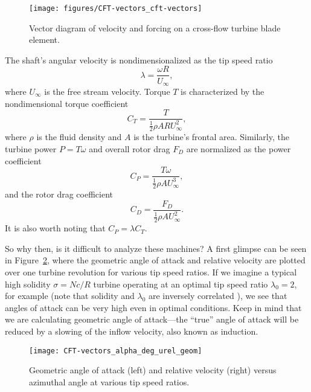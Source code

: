 \begin{figure}[ht]
    \centering
    
    \texttt{[image: figures/CFT-vectors\_cft-vectors]}
    
    \caption{Vector diagram of velocity and forcing on a cross-flow turbine
        blade element.}
    
    \label{fig:vectors}
\end{figure}

The shaft's angular velocity is nondimensionalized as the tip speed ratio
\begin{equation}
    \lambda = \frac{\omega R}{U_\infty},
    \label{eq:lambda}
\end{equation}
where $U_\infty$ is the free stream velocity.
Torque $T$ is characterized by the nondimensional torque coefficient 
\begin{equation}
    C_T = \frac{T}{\frac{1}{2} \rho A R U_\infty^2},
    \label{eq:ct}
\end{equation}
where $\rho$ is the fluid density and $A$ is the turbine's frontal area.
Similarly, the turbine power $P = T\omega$ and overall rotor drag $F_D$ are
normalized as the power coefficient
\begin{equation}
    C_P = \frac{T \omega}{\frac{1}{2} \rho A U_\infty^3},
    \label{eq:cp}
\end{equation}
and the rotor drag coefficient
\begin{equation}
    C_D = \frac{F_D}{\frac{1}{2} \rho A U_\infty^2}.
    \label{eq:cd}
\end{equation}
It is also worth noting that $C_P = \lambda C_T$.

So why then, is it difficult to analyze these machines? A first glimpse can be
seen in Figure~\ref{fig:geom-alpha-urel}, where the geometric angle of attack
and relative velocity are plotted over one turbine revolution for various tip
speed ratios. If we imagine a typical high solidity $\sigma = Nc/R$ turbine
operating at an optimal tip speed ratio $\lambda_0 = 2$, for example
\cite{Howell2010} (note that solidity and $\lambda_0$ are inversely correlated
\cite{Templin1974}), we see that angles of attack can be very high even in
optimal conditions. Keep in mind that we are calculating geometric angle of
attack---the ``true'' angle of attack will be reduced by a slowing of the inflow
velocity, also known as induction.

\begin{figure}[ht]
    \centering
    
    \texttt{[image: CFT-vectors\_alpha\_deg\_urel\_geom]}
    
    \caption{Geometric angle of attack (left) and relative velocity (right)
        versus azimuthal angle at various tip speed ratios.}
    
    \label{fig:geom-alpha-urel}
\end{figure}

